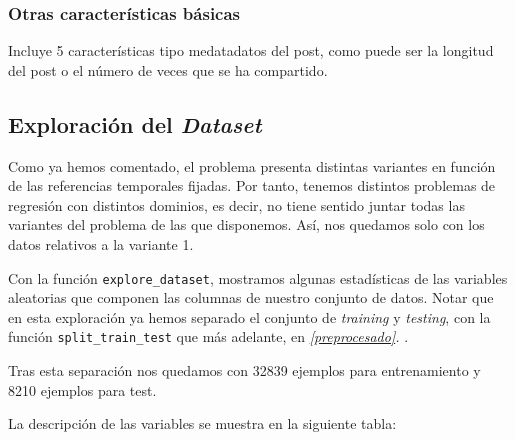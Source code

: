 \documentclass[11pt]{article}
\begin{document}
\subsubsection{Otras características básicas}

Incluye 5 características tipo medatadatos del post, como puede ser la longitud del post o el número de veces que se ha compartido.

\subsection{Exploración del \emph{Dataset}} \label{exploracion_datos} \label{boxplot}

Como ya hemos comentado, el problema presenta distintas variantes en función de las referencias temporales fijadas. Por tanto, tenemos distintos problemas de regresión con distintos dominios, es decir, no tiene sentido juntar todas las variantes del problema de las que disponemos. Así, nos quedamos solo con los datos relativos a la variante 1.

Con la función \lstinline{explore_dataset}, mostramos algunas estadísticas de las variables aleatorias que componen las columnas de nuestro conjunto de datos. Notar que en esta exploración ya hemos separado el conjunto de \emph{training} y \emph{testing}, con la función \lstinline{split_train_test} que más adelante, en \emph{\ref{preprocesado}. }.

Tras esta separación nos quedamos con 32839 ejemplos para entrenamiento y 8210 ejemplos para test.

La descripción de las variables se muestra en la siguiente tabla:
\end{document}

